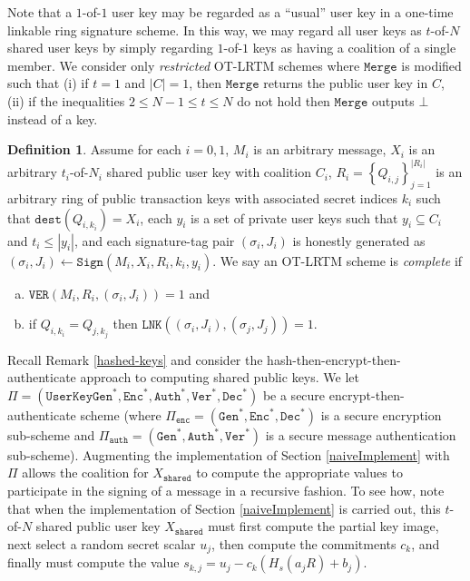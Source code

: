 \documentclass{mrl}
\theoremstyle{definition}
\newtheorem{defn}[theorem]{Definition}
\begin{document}
 Note that a $1$-of-$1$ user key may be regarded as a ``usual'' user key in a one-time linkable ring signature scheme. In this way, we may regard all user keys as $t$-of-$N$ shared user keys by simply regarding $1$-of-$1$ keys as having a coalition of a single member. We consider only \textit{restricted} OT-LRTM schemes where $\texttt{Merge}$ is modified such that (i) if $t=1$ and $\left|C\right| = 1$, then $\texttt{Merge}$ returns the public user key in $C$, (ii) if the inequalities $2 \leq N-1 \leq t \leq N$ do not hold then $\texttt{Merge}$ outputs $\bot$ instead of a key.

\begin{defn}
Assume for each $i=0,1$, $M_i$ is an arbitrary message, $X_i$ is an arbitrary $t_i$-of-$N_i$ shared public user key with coalition $C_i$, $R_i=\left\{Q_{i,j}\right\}_{j=1}^{\left|R_i\right|}$ is an arbitrary ring of public transaction keys with associated secret indices $k_i$ such that $\texttt{dest}(Q_{i,k_i}) = X_i$, each $y_i$ is a set of private user keys such that $y_i \subseteq C_i$ and $t_i \leq \left|y_i\right|$, and each signature-tag pair $(\sigma_i, J_i)$ is honestly generated as $(\sigma_i, J_i) \leftarrow \texttt{Sign}(M_i,X_i,R_i,k_i,y_i)$. We say an OT-LRTM scheme is \textit{complete} if
\begin{enumerate}[(a)]
\item $\texttt{VER}(M_i,R_i,(\sigma_i,J_i)) = 1$ and
\item if $Q_{i,k_i} = Q_{j,k_j}$ then $\texttt{LNK}((\sigma_i, J_i), (\sigma_j, J_j))=1$.
\end{enumerate}
\end{defn}



Recall Remark \ref{hashed-keys} and consider the hash-then-encrypt-then-authenticate approach to computing shared public keys. We let $\Pi = (\texttt{UserKeyGen}^*,\texttt{Enc}^*, \texttt{Auth}^*, \texttt{Ver}^*, \texttt{Dec}^*)$ be a secure encrypt-then-authenticate scheme (where $\Pi_{\texttt{enc}} = (\texttt{Gen}^*,\texttt{Enc}^*, \texttt{Dec}^*)$ is a secure encryption sub-scheme and $\Pi_{\texttt{auth}} = (\texttt{Gen}^*,\texttt{Auth}^*, \texttt{Ver}^*)$ is a secure message authentication sub-scheme). Augmenting the implementation of Section \ref{naiveImplement} with $\Pi$ allows the coalition for $X_{\texttt{shared}}$ to compute the appropriate values to participate in the signing of a message in a recursive fashion. To see how, note that when the implementation of Section \ref{naiveImplement} is carried out, this $t$-of-$N$ shared public user key $X_{\texttt{shared}}$ must first compute the partial key image, next select a random secret scalar $u_j$, then compute the commitments $c_k$, and finally must compute the value $s_{k,j} = u_j - c_k (H_s(a_j R) + b_j)$. 
\end{document}
